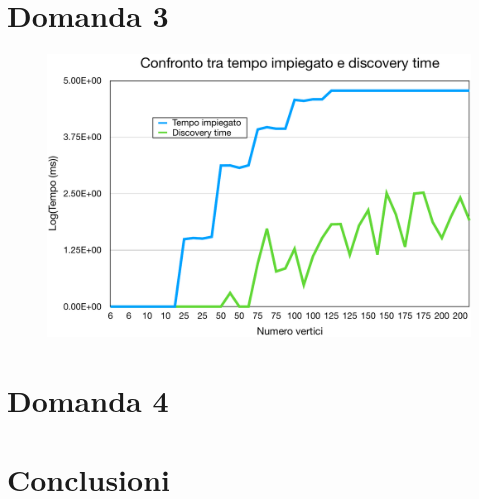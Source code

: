\documentclass[a4paper]{article}
\begin{document}
\section{Domanda 3}
\begin{figure}[H]
	\begin{center}
	\includegraphics[width=17cm]{discoveryvsfulltime}
	\label{fig:discoveryvsfulltime}
\end{center}
\end{figure}

\section{Domanda 4}
\section{Conclusioni}
\end{document}
